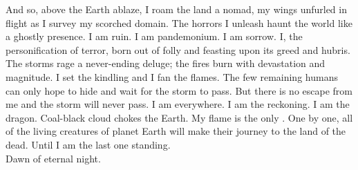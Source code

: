 And so, above the Earth ablaze, I roam the land a nomad, my wings unfurled in flight as I survey my scorched domain. The horrors I unleash haunt the world like a ghostly presence. I am ruin. I am pandemonium. I am sorrow. I, the personification of terror, born out of  folly and feasting upon its greed and hubris. The storms rage a never-ending deluge; the fires burn with devastation and magnitude. I set the kindling and I fan the flames. The few remaining humans can only hope to hide and wait for the storm to pass. But there is no escape from me and the storm will never pass. I am everywhere. I am the reckoning. I am the dragon. Coal-black cloud chokes the Earth. My flame is the only . One by one, all of the living creatures of planet Earth will make their journey to the land of the dead. Until I am the last one standing. \\

Dawn of eternal night. \\
